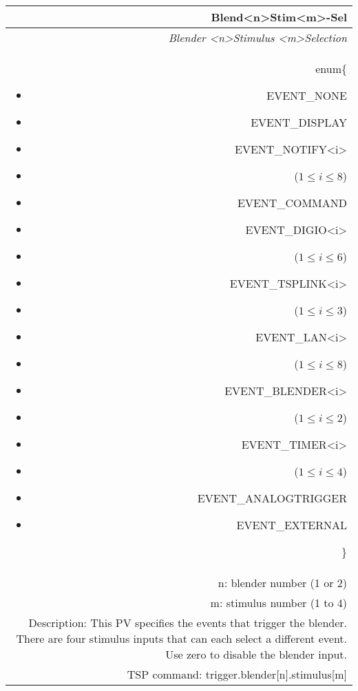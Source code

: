 \documentclass[openany]{article}
\begin{document}
		\begin{tabular}{N}
			\hline
			\bfseries Blend{\textless n\textgreater}Stim{\textless m\textgreater}-Sel\label{pv:blendstim-sel} \\ \hline
			\emph{Blender \textless n\textgreater Stimulus \textless m\textgreater Selection} \\
			enum\{\begin{itemize}[noitemsep]
				\small
				\item[] EVENT\_NONE
				\item[] EVENT\_DISPLAY
				\item[] EVENT\_NOTIFY\textless i\textgreater
				\item[] ($1\leq i\leq 8$)
				\item[] EVENT\_COMMAND
				\item[] EVENT\_DIGIO\textless i\textgreater
				\item[] ($1\leq i\leq 6$)
				\item[] EVENT\_TSPLINK\textless i\textgreater
				\item[] ($1\leq i\leq 3$)
				\item[] EVENT\_LAN\textless i\textgreater
				\item[] ($1\leq i\leq 8$)
				\item[] EVENT\_BLENDER\textless i\textgreater 
				\item[] ($1\leq i\leq 2$)
				\item[] EVENT\_TIMER\textless i\textgreater
				\item[] ($1\leq i\leq 4$)
				\item[] EVENT\_ANALOGTRIGGER
				\item[] EVENT\_EXTERNAL
			\end{itemize}\} \\
			n: blender number (1 or 2) \\
			m: stimulus number (1 to 4) \\
			Description: This PV specifies the events that trigger the blender. There are four stimulus inputs that can each select a different event. Use zero to disable the blender input. \\
			TSP command: trigger.blender[n].stimulus[m]
		\end{tabular}
\end{document}
